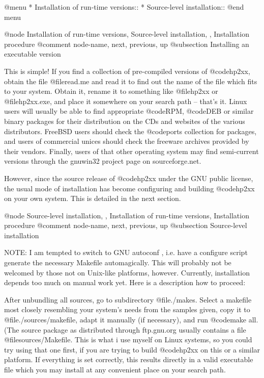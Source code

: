 @menu
* Installation of run-time versions::
* Source-level installation::
@end menu

@node Installation of run-time versions, Source-level installation, , Installation procedure
@comment  node-name,  next,  previous,  up
@subsection Installing an executable version

This is simple! If you find a collection of pre-compiled versions of
@code{hp2xx}, obtain the file @file{read.me} and read it to find out the
name of the file which fits to your system. Obtain it, rename it to something
like @file{hp2xx} or @file{hp2xx.exe}, and place it somewhere on your
search path -- that's it.
Linux users will usually be able to find appropriate @code{RPM}, @code{DEB}
or similar binary packages for their distribution on the CDs and websites
of the various distributors. FreeBSD users should check the @code{ports}
collection for packages, and users of commercial unices should check the
freeware archives provided by their vendors. Finally, users of that other 
operating system may find semi-current versions through the gnuwin32 project 
page on sourceforge.net. 

However, since the source release of @code{hp2xx} under the GNU public
license, the usual mode of installation has become configuring and 
building @code{hp2xx} on your own system. This is detailed in the next section. 



@node Source-level installation, , Installation of run-time versions, Installation procedure
@comment  node-name,  next,  previous,  up
@subsection Source-level installation

NOTE: I am tempted to switch to GNU autoconf , i.e. have a configure
script generate the necessary Makefile automagically. This will probably
not be welcomed by those not on Unix-like platforms, however.
Currently, installation depends too much
on manual work yet. Here is a description how to proceed:

After unbundling all sources, go to subdirectory @file{./makes}. Select a
makefile most closely resembling your system's needs from the samples given,
copy it to @file{./sources/makefile}, adapt it manually (if necessary),
and run @code{make all}. (The source package as distributed through
ftp.gnu.org usually contains a file @file{sources/Makefile}. This is what
i use myself on Linux systems, so you could try using that one first, if you
are trying to build @code{hp2xx} on this or a similar platform.
If everything is set correctly, this results directly in a valid executable
file which you may install at any convenient place on your search path.

